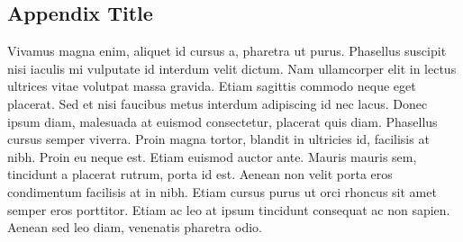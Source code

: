 \documentclass[draft, grl]{agutex}
\begin{document}
\begin{article}




\appendix

\section{Appendix Title}

Vivamus magna enim, aliquet id cursus a, pharetra ut purus. Phasellus suscipit nisi iaculis mi vulputate id interdum velit dictum. Nam ullamcorper elit in lectus ultrices vitae volutpat massa gravida. Etiam sagittis commodo neque eget placerat. Sed et nisi faucibus metus interdum adipiscing id nec lacus. Donec ipsum diam, malesuada at euismod consectetur, placerat quis diam. Phasellus cursus semper viverra. Proin magna tortor, blandit in ultricies id, facilisis at nibh. Proin eu neque est. Etiam euismod auctor ante. Mauris mauris sem, tincidunt a placerat rutrum, porta id est. Aenean non velit porta eros condimentum facilisis at in nibh. Etiam cursus purus ut orci rhoncus sit amet semper eros porttitor. Etiam ac leo at ipsum tincidunt consequat ac non sapien. Aenean sed leo diam, venenatis pharetra odio.


%
%
%


\end{article}
\end{document}
